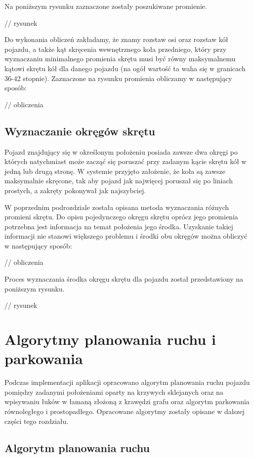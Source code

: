 \documentclass[a4paper,11pt,twoside]{report}
\theoremstyle{definition}
\begin{document}
Na poniższym rysunku zaznaczone zostały poszukiwane promienie.

// rysunek

Do wykonania obliczeń zakładamy, że znamy rozstaw osi oraz rozstaw kół pojazdu, a także kąt skręcenia wewnętrznego koła przedniego, który przy wyznaczaniu minimalnego promienia skrętu musi być równy maksymalnemu kątowi skrętu kół dla danego pojazdu (na ogół wartość ta waha się w granicach 36-42 stopnie). Zaznaczone na rysunku promienia obliczamy w następujący sposób:

// obliczenia

\section{Wyznaczanie okręgów skrętu}

Pojazd znajdujący się w określonym położeniu posiada zawsze dwa okręgi po których natychmiast może zacząć się poruszać przy zadanym kącie skrętu kół w jedną lub drugą stronę. W systemie przyjęto założenie, że koła są zawsze maksymalnie skręcone, tak aby pojazd jak najwięcej poruszał się po liniach prostych, a zakręty pokonywał jak najszybciej. 

W poprzednim podrozdziale została opisana metoda wyznaczania różnych promieni skrętu. Do opisu pojedynczego okręgu skrętu oprócz jego promienia potrzebna jest informacja na temat położenia jego środka. Uzyskanie takiej informacji nie stanowi większego problemu i środki obu okręgów można obliczyć w następujący sposób:

// obliczenia
	
Proces wyznaczania środka okręgu skrętu dla pojazdu został przedstawiony na poniższym rysunku.

// rysunek


\chapter{Algorytmy planowania ruchu i parkowania}

Podczas implementacji aplikacji opracowano algorytm planowania ruchu pojazdu pomiędzy zadanymi położeniami oparty na krzywych sklejanych oraz na wpisywaniu łuków w łamaną złożoną z krawędzi grafu oraz algorytm parkowania równoległego i prostopadłego. Opracowane algorytmy zostały opisane w dalszej części tego rozdziału.

\section{Algorytm planowania ruchu}
\end{document}
